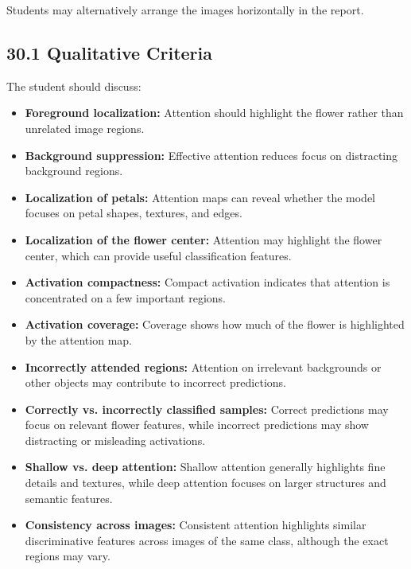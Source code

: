 \documentclass[10pt]{article}
\begin{document}
Students may alternatively arrange the images horizontally in the report.

\subsection*{30.1 Qualitative Criteria}

The student should discuss:


\begin{itemize}

\item \textbf{Foreground localization:} Attention should highlight the flower rather than unrelated image regions.

\item \textbf{Background suppression:} Effective attention reduces focus on distracting background regions.

\item \textbf{Localization of petals:} Attention maps can reveal whether the model focuses on petal shapes, textures, and edges.

\item \textbf{Localization of the flower center:} Attention may highlight the flower center, which can provide useful classification features.

\item \textbf{Activation compactness:} Compact activation indicates that attention is concentrated on a few important regions.

\item \textbf{Activation coverage:} Coverage shows how much of the flower is highlighted by the attention map.

\item \textbf{Incorrectly attended regions:} Attention on irrelevant backgrounds or other objects may contribute to incorrect predictions.

\item \textbf{Correctly vs. incorrectly classified samples:} Correct predictions may focus on relevant flower features, while incorrect predictions may show distracting or misleading activations.

\item \textbf{Shallow vs. deep attention:} Shallow attention generally highlights fine details and textures, while deep attention focuses on larger structures and semantic features.

\item \textbf{Consistency across images:} Consistent attention highlights similar discriminative features across images of the same class, although the exact regions may vary.

\end{itemize}
\end{document}
